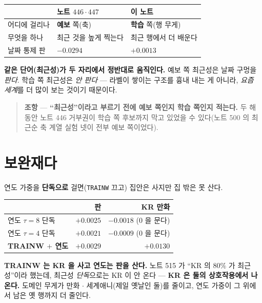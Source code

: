 \documentclass[11pt]{article}
\begin{document}
\begin{center}
\begin{tabular}{lll}
\hline
& 노트 $446 \cdot 447$ & 이 노트 \\
\hline
어디에 걸리나 & \textbf{예보} 쪽(축) & \textbf{학습} 쪽(행 무게) \\
무엇을 하나 & 최근 것을 높게 찍는다 & 최근 행에서 더 배운다 \\
날짜 통제 판 & $-0.0294$ & $\mathbf{+0.0013}$ \\
\hline
\end{tabular}
\end{center}

\textbf{같은 단어(최근성)가 두 자리에서 정반대로 움직인다.} 예보 쪽
최근성은 날짜 구멍을 \emph{판다}. 학습 쪽 최근성은 \emph{안 판다} --- 라벨이
쌓이는 구조를 흉내 내는 게 아니라, \emph{요즘 세계}를 더 많이 보는 것이기
때문이다.

\begin{quote}
\textbf{조항} --- \textbf{``최근성''이라고 부르기 전에 예보 쪽인지 학습
쪽인지 적는다.} 두 해 동안 노트 446 거부권이 학습 쪽 후보까지 막고 있었을
수 있다(노트 500 의 최근순 축 계열 실험 넷이 전부 예보 쪽이었다).
\end{quote}

\section{보완재다}

연도 가중을 \textbf{단독으로} 걸면(\texttt{TRAINW} 끄고) 집안은 사지만
집 밖은 못 산다.

\begin{center}
\begin{tabular}{lrr}
\hline
& 판 & KR 만화 \\
\hline
연도 $\tau{=}8$ 단독 & $+0.0025$ & $-0.0018$ ($0$ 을 문다) \\
연도 $\tau{=}4$ 단독 & $+0.0021$ & $-0.0009$ ($0$ 을 문다) \\
\textbf{TRAINW $+$ 연도} & $+0.0029$ & $\mathbf{+0.0130}$ \\
\hline
\end{tabular}
\end{center}

\textbf{TRAINW 는 KR 을 사고 연도는 판을 산다.} 노트 515 가 ``KR 의
$80\%$ 가 최근성''이라 했는데, 최근성 \emph{단독}으로는 KR 이 안 온다 ---
\textbf{KR 은 둘의 상호작용에서 나온다.} 도메인 무게가 만화 $\cdot$
세계애니(제일 옛날인 둘)를 줄이고, 연도 가중이 그 위에서 남은 옛 행까지
더 줄인다.
\end{document}
